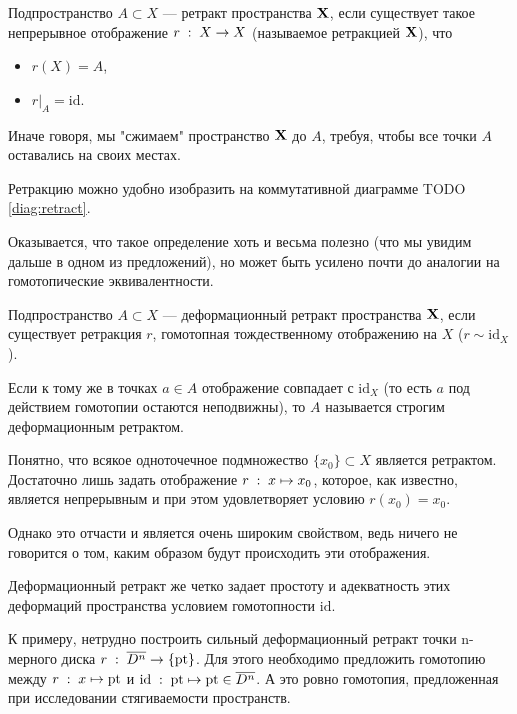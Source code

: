 \begin{Def}
    Подпространство $A\subset X$ --- ретракт пространства $\mathbf{X}$, если существует такое непрерывное отображение $r\; : \; X \to X$ (называемое ретракцией $\mathbf{X}$), что
    \begin{itemize}
        \item $r(X) = A$, 
        \item $\left. r \right|_A = \mathrm{id}$. 
    \end{itemize}
\end{Def}

\begin{Note}
    Иначе говоря, мы "сжимаем" пространство $\mathbf{X}$ до $A$, требуя, чтобы все точки  $A$ оставались на своих местах.

    Ретракцию можно удобно изобразить на коммутативной диаграмме TODO \ref{diag:retract}. 
\end{Note}

Оказывается, что такое определение хоть и весьма полезно (что мы увидим дальше в одном из предложений), но может быть усилено почти до аналогии на гомотопические эквивалентности.

\begin{Def}
    Подпространство $A \subset X$ --- деформационный ретракт пространства $\mathbf{X}$, если существует ретракция $r$, гомотопная тождественному отображению на $X$ ($r \sim \mathrm{id}_X$).

    Если к тому же в точках $a\in A$ отображение совпадает с  $\mathrm{id}_X$ (то есть $a$ под действием гомотопии остаются неподвижны), то $A$ называется строгим деформационным ретрактом.
\end{Def}
 
\begin{Ex}
    Понятно, что всякое одноточечное подмножество $\{x_0\} \subset X$ является ретрактом. Достаточно лишь задать отображение $r\; : \; x \mapsto x_0$, которое, как известно, является непрерывным и при этом удовлетворяет условию $r(x_0) = x_0$.

    Однако это отчасти и является очень широким свойством, ведь ничего не говорится о том, каким образом будут происходить эти отображения. 

    Деформационный ретракт же четко задает простоту и адекватность этих деформаций пространства условием гомотопности $\mathrm{id}$.

    К примеру, нетрудно построить сильный деформационный ретракт точки n-мерного диска $r\; : \; \overline{D^n} \to \{\mathrm{pt}\}$. Для этого необходимо предложить гомотопию между $r\; : \; x\mapsto \mathrm{pt}$ и $\mathrm{id}\; : \; \mathrm{pt} \mapsto \mathrm{pt} \in \overline{D^n}$. А это ровно гомотопия, предложенная при исследовании стягиваемости пространств.
\end{Ex}

